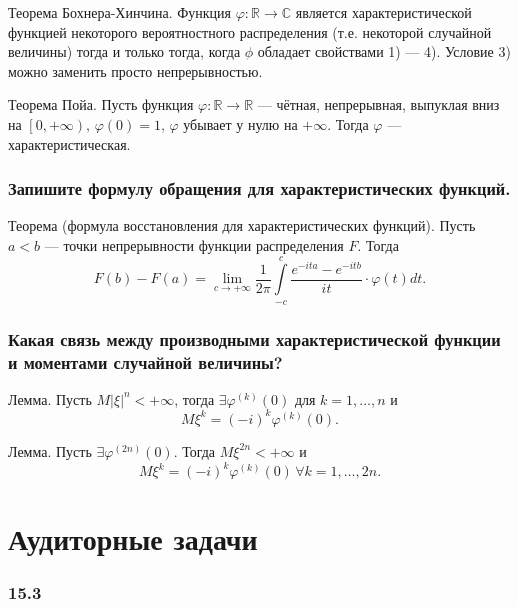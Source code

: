 Теорема Бохнера-Хинчина.
Функция $ \varphi: \mathbb{R} \rightarrow \mathbb{C}$ является характеристической функцией некоторого вероятностного распределения (т.е. некоторой случайной величины)
тогда и только тогда, когда $ \phi $ обладает свойствами 1) --- 4).
Условие 3) можно заменить просто непрерывностью.

Теорема Пойа.
Пусть функция $ \varphi: \mathbb{R} \rightarrow \mathbb{R}$ --- чётная, непрерывная,
выпуклая вниз на $ \left[ 0, + \infty \right), \, \varphi \left( 0 \right) = 1, \, \varphi $ убывает у нулю на $+ \infty $.
Тогда $ \varphi $ --- характеристическая.

\subsubsection*{Запишите формулу обращения для характеристических функций.}

Теорема (формула восстановления для характеристических функций).
Пусть $ a < b$ --- точки непрерывности функции распределения $F$.
Тогда
$$F \left( b \right) - F \left( a \right) =
\lim \limits_{c \to + \infty } \frac{1}{2 \pi } \int \limits_{-c}^c \frac{e^{-ita} - e^{-itb}}{it} \cdot \varphi(t) dt.$$

\subsubsection*{Какая связь между производными характеристической функции и моментами случайной величины?}

Лемма.
Пусть $M \left| \xi \right|^n < + \infty $, тогда $ \exists \varphi^{ \left( k \right) } \left( 0 \right) $ для
$k = 1, \dotsc, n$ и
$$M \xi^k =
\left( -i \right)^k \varphi^{ \left( k \right) } \left( 0 \right).$$

Лемма.
Пусть $ \exists \varphi^{ \left( 2n \right) } \left( 0 \right) $.
Тогда $M \xi^{2n} < + \infty $ и
$$M \xi^k = \left( -i \right)^k \varphi^{ \left( k \right) } \left( 0 \right) \,
\forall k = 1, \dotsc, 2n.$$

\section*{Аудиторные задачи}

\subsubsection*{15.3}


